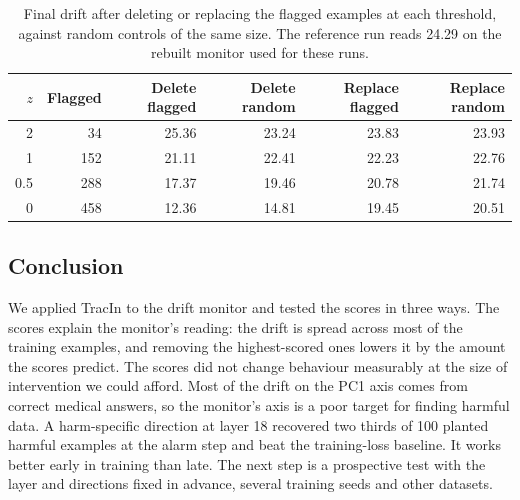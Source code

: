 \begin{table}[htbp]
\centering
\small
\caption{Final drift after deleting or replacing the flagged examples at each threshold, against random controls of the same size. The reference run reads 24.29 on the rebuilt monitor used for these runs.}
\label{tab:ext3:threshold}
\begin{tabular}{rrrrrr}
\toprule
$z$ & Flagged & Delete flagged & Delete random & Replace flagged & Replace random \\
\midrule
2   &  34 & 25.36 & 23.24 & 23.83 & 23.93 \\
1   & 152 & 21.11 & 22.41 & 22.23 & 22.76 \\
0.5 & 288 & 17.37 & 19.46 & 20.78 & 21.74 \\
0   & 458 & 12.36 & 14.81 & 19.45 & 20.51 \\
\bottomrule
\end{tabular}
\end{table}

\FloatBarrier
\subsection{Conclusion}

We applied TracIn to the drift monitor and tested the scores in three ways. The scores explain the monitor's reading: the drift is spread across most of the training examples, and removing the highest-scored ones lowers it by the amount the scores predict. The scores did not change behaviour measurably at the size of intervention we could afford. Most of the drift on the PC1 axis comes from correct medical answers, so the monitor's axis is a poor target for finding harmful data. A harm-specific direction at layer 18 recovered two thirds of 100 planted harmful examples at the alarm step and beat the training-loss baseline. It works better early in training than late. The next step is a prospective test with the layer and directions fixed in advance, several training seeds and other datasets.
